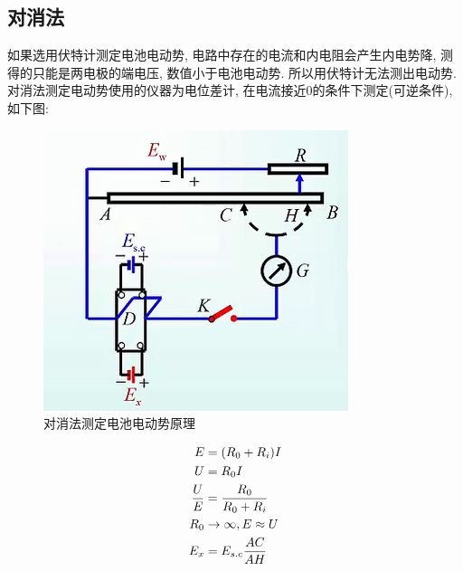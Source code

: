 \documentclass[a4paper]{article}
\begin{document}
\subsection{对消法}
如果选用伏特计测定电池电动势, 电路中存在的电流和内电阻会产生内电势降, 
测得的只能是两电极的端电压, 数值小于电池电动势. 所以用伏特计无法测出电动势. 
对消法测定电动势使用的仪器为电位差计, 在电流接近0的条件下测定(可逆条件), 
如下图:
\begin{figure}[H]
	\centering
	\includegraphics[width = 0.30\paperwidth]{fig/principle.png}
	\caption{对消法测定电池电动势原理}\label{wf}
\end{figure}
\begin{equation}
	\centering
	\begin{aligned}
		E &= (R_{0} + R_{i})I\\
		U &= R_{0}I\\
		\frac{U}{E} &= \frac{R_{0}}{R_{0}+R_{i}}\\
		R_{0}&\to \infty, E\approx U\\
		E_{x} &= E_{s.c}\frac{AC}{AH}\\
	\end{aligned}
\end{equation}
\end{document}
